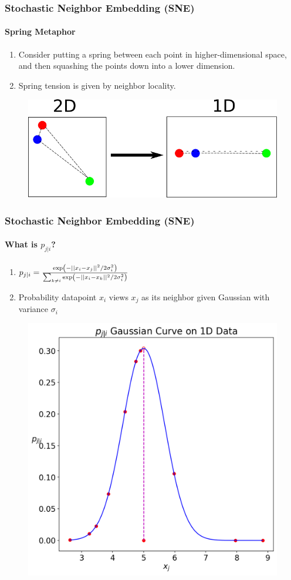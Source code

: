\documentclass{beamer}
\begin{document}
\begin{frame}
  \frametitle{Stochastic Neighbor Embedding (SNE)}
  \framesubtitle{Spring Metaphor}

  \begin{enumerate}
  \item Consider putting a spring between each point in
    higher-dimensional space, and then squashing the points down into a
    lower dimension.

  \item Spring tension is given by neighbor locality.
  \end{enumerate}

  \begin{figure}
    \centering
    \includegraphics[width=\linewidth]{images/spring.png}
  \end{figure}
\end{frame}

\begin{frame}
  \frametitle{Stochastic Neighbor Embedding (SNE)}
  \framesubtitle{What is $p_{j|i}$?}

  \begin{enumerate}
  \item $p_{j|i} = \frac{\exp\del{-|| x_i - x_j ||^2/2\sigma_i^2}}{\sum_{k \neq i} \exp\del{-|| x_i - x_k ||^2/2\sigma_i^2}}$
  \item Probability datapoint $x_i$ views $x_j$ as its neighbor given Gaussian with variance $\sigma_i$
  \end{enumerate}

  \begin{figure}
    \centering
    \includegraphics[width=0.5\linewidth]{images/gauss/gauss.png}
  \end{figure}
\end{frame}
\end{document}
